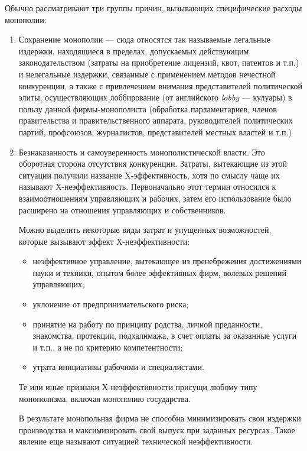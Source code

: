 \documentclass[12pt]{article}
\begin{document}
    Обычно рассматривают три группы причин, вызывающих специфические расходы монополии:

    \begin{enumerate}
        \item Сохранение монополии --- сюда относятся так называемые легальные издержки, находящиеся в пределах, допускаемых действующим законодательством (затраты на приобретение лицензий, квот, патентов и т.п.) и нелегальные издержки, связанные с применением методов нечестной конкуренции, а также с привлечением внимания представителей политической элиты, осуществляющих лоббирование (от английского \emph{lobby} --- кулуары) в пользу данной фирмы-монополиста (обработка парламентариев, членов правительства и правительственного аппарата, руководителей политических партий, профсоюзов, журналистов, представителей местных властей и т.п.)

        \item Безнаказанность и самоуверенность монополистической власти. Это оборотная сторона отсутствия конкуренции. Затраты, вытекающие из этой ситуации получили название X-эффективность, хотя по смыслу чаще их называют Х-неэффективность. Первоначально этот термин относился к взаимоотношениям управляющих и рабочих, затем его использование было расширено на отношения управляющих и собственников.

        Можно выделить некоторые виды затрат и упущенных возможностей, которые вызывают эффект Х-неэффективности:
        \begin{itemize}
            \item неэффективное управление, вытекающее из пренебрежения достижениями науки и техники, опытом более эффективных фирм, волевых решений управляющих;

            \item уклонение от предпринимательского риска;

            \item принятие на работу по принципу родства, личной преданности, знакомства, протекции, подхалимажа, в счет оплаты за оказанные услуги и т.п., а не по критерию компетентности;

            \item утрата инициативы рабочими и специалистами.
        \end{itemize}


        Те или иные признаки Х-неэффективности присущи любому типу монополизма, включая монополию государства.

        В результате монопольная фирма не способна минимизировать свои издержки производства и максимизировать свой выпуск при заданных ресурсах. Такое явление еще называют ситуацией технической неэффективности.


\end{enumerate}
\end{document}
